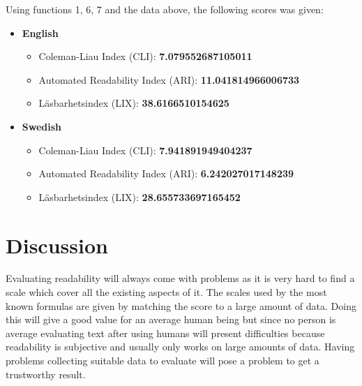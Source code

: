 \documentclass[a4paper]{article}
\begin{document}
Using functions 1, 6, 7 and the data above, the following scores was given:

\begin{itemize}
    \item \textbf{English}
    \begin{itemize}
        \item Coleman-Liau Index (CLI): \textbf{7.079552687105011}
        \item Automated Readability Index (ARI): \textbf{11.041814966006733 }
        \item Läsbarhetsindex (LIX): \textbf{38.6166510154625}
    \end{itemize}
    \item \textbf{Swedish}
    \begin{itemize}
        \item Coleman-Liau Index (CLI): \textbf{7.941891949404237}
        \item Automated Readability Index (ARI): \textbf{6.242027017148239}
        \item Läsbarhetsindex (LIX): \textbf{28.655733697165452}
    \end{itemize}
\end{itemize}

\section{Discussion}
Evaluating readability will always come with problems as it is very hard to find a scale which cover all the existing aspects of it. The scales used by the most known formulas are given by matching the score to a large amount of data. Doing this will give a good value for an average human being but since no person is average evaluating text after using humans will present difficulties because readability is subjective and usually only works on large amounts of data. Having problems collecting suitable data to evaluate will pose a problem to get a trustworthy result. 
\end{document}
